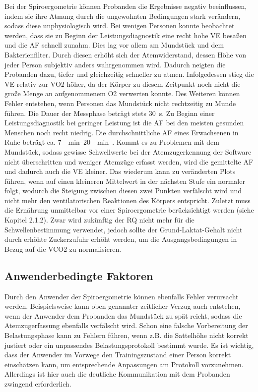 Bei der Spiroergometrie können Probanden die Ergebnisse negativ beeinflussen, indem sie ihre Atmung durch die ungewohnten Bedingungen stark verändern, sodass diese unphysiologisch wird. Bei wenigen Personen konnte beobachtet werden, dass sie zu Beginn der Leistungsdiagnostik eine recht hohe \acs{VE} besaßen und die \acs{AF} schnell zunahm. Dies lag vor allem am Mundstück und dem Bakterienfilter. Durch diesen erhöht sich der Atemwiderstand, dessen Höhe von jeder Person subjektiv anders wahrgenommen wird. Dadurch neigten die Probanden dazu, tiefer und gleichzeitig schneller zu atmen. Infolgedessen stieg die \acs{VE} relativ zur \acs{VO2} höher, da der Körper zu diesem Zeitpunkt noch nicht die große Menge an aufgenommenem \acs{O2} verwerten konnte. Des Weiteren können Fehler entstehen, wenn Personen das Mundstück nicht rechtzeitig zu Munde führen. Die Dauer der Messphase beträgt stets \SI{30}{\second}. Zu Beginn einer Leistungsdiagnostik bei geringer Leistung ist die \acs{AF} bei den meisten gesunden Menschen noch recht niedrig. Die durchschnittliche \acs{AF} eines Erwachsenen in Ruhe beträgt ca. \SIrange{7}{20}{\per\minute}~\cite{Larsen.2017}. Kommt es zu Problemen mit dem Mundstück, sodass gewisse Schwellwerte bei der Atemzugerkennung der Software nicht überschritten und weniger Atemzüge erfasst werden, wird die gemittelte \acs{AF} und dadurch auch die \acs{VE} kleiner. Das wiederum kann zu veränderten Plots führen, wenn auf einen kleineren Mittelwert in der nächsten Stufe ein normaler folgt, wodurch die Steigung zwischen diesen zwei Punkten verfälscht wird und nicht mehr den ventilatorischen Reaktionen des Körpers entspricht. Zuletzt muss die Ernährung unmittelbar vor einer Spiroergometrie berücksichtigt werden (siehe Kapitel 2.1.2). Zwar wird zukünftig der RQ nicht mehr für die Schwellenbestimmung verwendet, jedoch sollte der Grund-Laktat-Gehalt nicht durch erhöhte Zuckerzufuhr erhöht werden, um die Ausgangsbedingungen in Bezug auf die \acs{VCO2} zu normalisieren.

\subsection{Anwenderbedingte Faktoren}

Durch den Anwender der Spiroergometrie können ebenfalls Fehler verursacht werden. Beispielsweise kann oben genannter zeitlicher Verzug auch entstehen, wenn der Anwender dem Probanden das Mundstück zu spät reicht, sodass die Atemzugerfassung ebenfalls verfälscht wird. Schon eine falsche Vorbereitung der Belastungsphase kann zu Fehlern führen, wenn z.B. die Sattelhöhe nicht korrekt justiert oder ein unpassendes Belastungsprotokoll bestimmt wurde. Es ist wichtig, dass der Anwender im Vorwege den Trainingszustand einer Person korrekt einschätzen kann, um entsprechende Anpassungen am Protokoll vorzunehmen. Allerdings ist hier auch die deutliche Kommunikation mit dem Probanden zwingend erforderlich.

